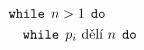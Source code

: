 \documentclass[preview]{standalone}
\begin{document}
\begin{align*}
\mathtt{while} & \:\: n > 1 \:\:  \mathtt{do}  \\&\hspace*{-16pt} \mathtt{while}  \:\: p_i \text{ dělí } n \:\:  \mathtt{do}
\end{align*}
\end{document}
